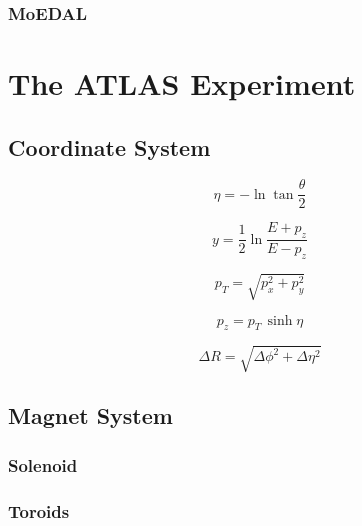 \subsubsection*{MoEDAL}



\section{The ATLAS Experiment}
\label{sed:cern:atlas}

\subsection{Coordinate System}

\begin{equation}
\label{eq:cern:eta}
\eta = - \ln \tan \frac{\theta}{2}
\end{equation}

\begin{equation}
\label{eq:cern:y}
y = \frac{1}{2} \ln \frac{E + p_z}{E - p_z}
\end{equation}

\begin{equation}
\label{eq:cern:pt}
p_T = \sqrt{p_x^2 + p_y^2}
\end{equation}

\begin{equation}
\label{eq:cern:pz}
p_z = p_T \,\sinh \eta
\end{equation}

\begin{equation}
\label{eq:cern:dR}
\Delta R = \sqrt{ \Delta \phi^2 + \Delta \eta^2  }
\end{equation}




\subsection{Magnet System}
\label{sec:cern:atlasmagnets}

\subsubsection*{Solenoid}

\subsubsection*{Toroids}



